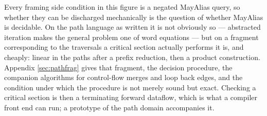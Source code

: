 Every framing side condition in this figure is a negated \textsf{MayAlias} query, so whether they can be discharged mechanically is the question of whether \textsf{MayAlias} is decidable.  On the path language as written it is not obviously so --- abstracted iteration makes the general problem one of word equations --- but on a fragment corresponding to the traversals a critical section actually performs it is, and cheaply: linear in the paths after a prefix reduction, then a product construction.  Appendix \ref{sec:pathfrag} gives that fragment, the decision procedure, the companion algorithms for control-flow merges and loop back edges, and the condition under which the procedure is not merely sound but exact.  Checking a critical section is then a terminating forward dataflow, which is what a compiler front end can run; a prototype of the path domain accompanies it.
